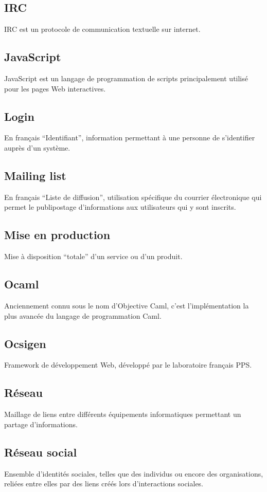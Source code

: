 \documentclass{life-fr}
\begin{document}
\subsection{ IRC}
IRC est un protocole de communication textuelle sur internet.

\subsection{ JavaScript}
JavaScript est un langage de programmation de scripts principalement utilisé pour les pages Web interactives.

\subsection{ Login}
En français ``Identifiant'', information permettant à une personne de s'identifier auprès d'un système.

\subsection{ Mailing list}
En français ``Liste de diffusion'', utilisation spécifique du courrier électronique qui permet le publipostage d'informations aux utilisateurs qui y sont inscrits.

\subsection{ Mise en production}
Mise à disposition ``totale'' d’un service ou d’un produit.

\subsection{ Ocaml}
Anciennement connu sous le nom d'Objective Caml, c’est l'implémentation la plus avancée du langage de programmation Caml.

\subsection{ Ocsigen}
Framework de développement Web, développé par le laboratoire français PPS.

\subsection{ Réseau}
Maillage de liens entre différents équipements informatiques permettant un partage d’informations.

\subsection{ Réseau social}
Ensemble d'identités sociales, telles que des individus ou encore des organisations, reliées entre elles par des liens créés lors d’interactions sociales.
\end{document}
